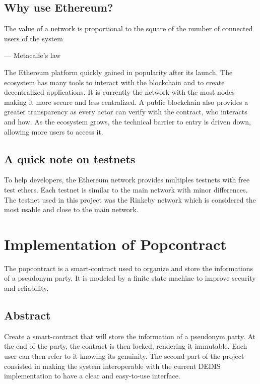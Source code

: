 \documentclass[11pt, a4paper, twoside, openright]{article} %
\begin{document}
\subsection{Why use Ethereum?}

\epigraph{The value of a network is proportional to the square of the number of connected users of the system}
{--- \textup{Metacalfe's law}}

The Ethereum platform quickly gained in popularity after its launch. The ecosystem has many tools to interact with the blockchain and to create decentralized applications. It is currently the network with the most nodes making it more secure and less centralized. A public blockchain also provides a greater transparency as every actor can verify with the contract, who interacts and how.
As the ecosystem grows, the technical barrier to entry is driven down, allowing more users to access it.

\subsection{A quick note on testnets}
To help developers, the Ethereum network provides multiples testnets with free test ethers. Each testnet is similar to the main network with minor differences. The testnet used in this project was the Rinkeby network which is considered the most usable and close to the main network.


\newpage



\section{Implementation of Popcontract}
The popcontract is a smart-contract used to organize and store the informations of a pseudonym party. It is modeled by a finite state machine to improve security and reliability.
\subsection{Abstract}
Create a smart-contract that will store the information of a pseudonym party. At the end of the party, the contract is then locked, rendering it immutable. Each user can then refer to it knowing its genuinity.
The second part of the project consisted in making the system interoperable with the current DEDIS implementation to have a clear and easy-to-use interface.
\end{document}
